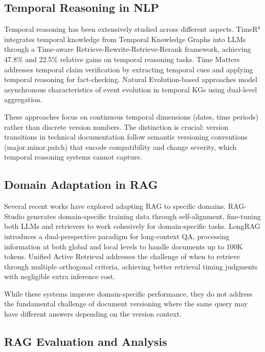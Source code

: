 \subsection{Temporal Reasoning in NLP}

Temporal reasoning has been extensively studied across different aspects. TimeR$^4$ \cite{qian2024timer4} integrates temporal knowledge from Temporal Knowledge Graphs into LLMs through a Time-aware Retrieve-Rewrite-Retrieve-Rerank framework, achieving 47.8\% and 22.5\% relative gains on temporal reasoning tasks. Time Matters \cite{barik2024timematters} addresses temporal claim verification by extracting temporal cues and applying temporal reasoning for fact-checking. Natural Evolution-based approaches \cite{chen2024natural} model asynchronous characteristics of event evolution in temporal KGs using dual-level aggregation.

These approaches focus on continuous temporal dimensions (dates, time periods) rather than discrete version numbers. The distinction is crucial: version transitions in technical documentation follow semantic versioning conventions (major.minor.patch) that encode compatibility and change severity, which temporal reasoning systems cannot capture.

\subsection{Domain Adaptation in RAG}

Several recent works have explored adapting RAG to specific domains. RAG-Studio \cite{mao2024ragstudio} generates domain-specific training data through self-alignment, fine-tuning both LLMs and retrievers to work cohesively for domain-specific tasks. LongRAG \cite{zhao2024longrag} introduces a dual-perspective paradigm for long-context QA, processing information at both global and local levels to handle documents up to 100K tokens. Unified Active Retrieval \cite{cheng2024unified} addresses the challenge of when to retrieve through multiple orthogonal criteria, achieving better retrieval timing judgments with negligible extra inference cost.

While these systems improve domain-specific performance, they do not address the fundamental challenge of document versioning where the same query may have different answers depending on the version context.

\subsection{RAG Evaluation and Analysis}

